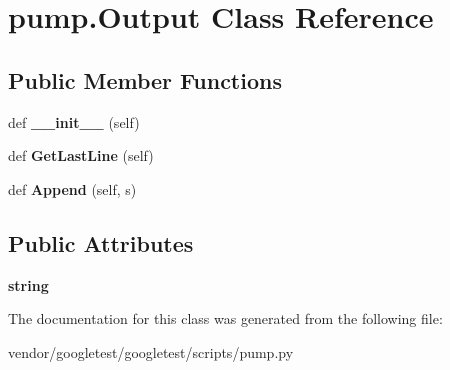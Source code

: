 \hypertarget{classpump_1_1Output}{}\section{pump.\+Output Class Reference}
\label{classpump_1_1Output}
\subsection*{Public Member Functions}
\begin{DoxyCompactItemize}
\item 
def {\bfseries \+\_\+\+\_\+init\+\_\+\+\_\+} (self)\hypertarget{classpump_1_1Output_a01a703055e40078561bd4a5011de4a6d}{}\label{classpump_1_1Output_a01a703055e40078561bd4a5011de4a6d}

\item 
def {\bfseries Get\+Last\+Line} (self)\hypertarget{classpump_1_1Output_a6ece94d24be171bae2a2234c052b4c58}{}\label{classpump_1_1Output_a6ece94d24be171bae2a2234c052b4c58}

\item 
def {\bfseries Append} (self, s)\hypertarget{classpump_1_1Output_a6f284bb3f80e03594bc28286c695f5a7}{}\label{classpump_1_1Output_a6f284bb3f80e03594bc28286c695f5a7}

\end{DoxyCompactItemize}
\subsection*{Public Attributes}
\begin{DoxyCompactItemize}
\item 
{\bfseries string}\hypertarget{classpump_1_1Output_a8786848ab3d235189379c449a446f883}{}\label{classpump_1_1Output_a8786848ab3d235189379c449a446f883}

\end{DoxyCompactItemize}


The documentation for this class was generated from the following file\+:\begin{DoxyCompactItemize}
\item 
vendor/googletest/googletest/scripts/pump.\+py\end{DoxyCompactItemize}
